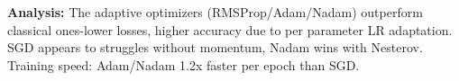 \documentclass[conference, twocolum]{IEEEtran}
\begin{document}
\textbf{Analysis:} The adaptive optimizers (RMSProp/Adam/Nadam) outperform classical ones-lower losses, higher accuracy due to per parameter LR adaptation. SGD appears to struggles without momentum, Nadam wins with Nesterov. Training speed: Adam/Nadam 1.2x faster per epoch than SGD.







\end{document}
